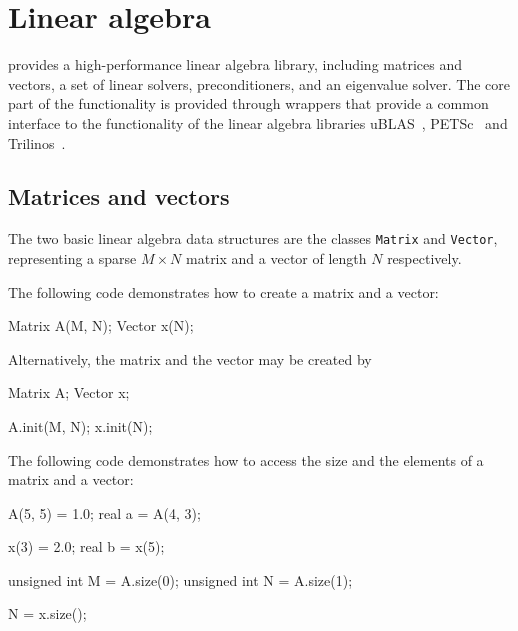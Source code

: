 \chapter{Linear algebra}





\dolfin{} provides a high-performance linear algebra library,
including matrices and vectors, a set of linear solvers,
preconditioners, and an eigenvalue solver. The core part of the
functionality is provided through wrappers that provide a common
interface to the functionality of the linear algebra libraries
uBLAS~\cite{www:ublas}, PETSc~\cite{www:petsc} and 
Trilinos~\cite{www.trilonos}.

\section{Matrices and vectors}

The two basic linear algebra data structures are the classes
\texttt{Matrix} and \texttt{Vector}, representing a sparse $M\times
N$ matrix and a vector of length $N$ respectively.

The following code demonstrates how to create a matrix and a vector:
\begin{code}
Matrix A(M, N);
Vector x(N);
\end{code}
Alternatively, the matrix and the vector may be created by
\begin{code}
Matrix A;
Vector x;

A.init(M, N);
x.init(N);
\end{code}

The following code demonstrates how to access the size and the
elements of a matrix and a vector:
\begin{code}
A(5, 5) = 1.0;
real a = A(4, 3);

x(3) = 2.0;
real b = x(5);

unsigned int M = A.size(0);
unsigned int N = A.size(1);

N = x.size();
\end{code}

